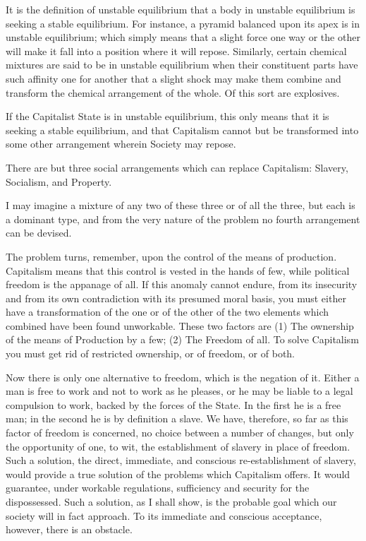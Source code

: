 \documentclass{book}
\begin{document}
It is the definition of unstable equilibrium that a body in unstable equilibrium is seeking a stable equilibrium. For instance, a pyramid balanced upon its apex is in unstable equilibrium; which simply means that a slight force one way or the other will make it fall into a position where it will repose. Similarly, certain chemical mixtures are said to be in unstable equilibrium when their constituent parts have such affinity one for another that a slight shock may make them combine and transform the chemical arrangement of the whole. Of this sort are explosives.

If the Capitalist State is in unstable equilibrium, this only means that it is seeking a stable equilibrium, and that Capitalism cannot but be transformed into some other arrangement wherein Society may repose.

There are but three social arrangements which can replace Capitalism: Slavery, Socialism, and Property.

I may imagine a mixture of any two of these three or of all the three, but each is a dominant type, and from the very nature of the problem no fourth arrangement can be devised.

The problem turns, remember, upon the control of the means of production. Capitalism means that this control is vested in the hands of few, while political freedom is the appanage of all. If this anomaly cannot endure, from its insecurity and from its own contradiction with its presumed moral basis, you must either have a transformation of the one or of the other of the two elements which combined have been found unworkable. These two factors are (1) The ownership of the means of Production by a few; (2) The Freedom of all. To solve Capitalism you must get rid of restricted ownership, or of freedom, or of both.

Now there is only one alternative to freedom, which is the negation of it. Either a man is free to work and not to work as he pleases, or he may be liable to a legal compulsion to work, backed by the forces of the State. In the first he is a free man; in the second he is by definition a slave. We have, therefore, so far as this factor of freedom is concerned, no choice between a number of changes, but only the opportunity of one, to wit, the establishment of slavery in place of freedom. Such a solution, the direct, immediate, and conscious re-establishment of slavery, would provide a true solution of the problems which Capitalism offers. It would guarantee, under workable regulations, sufficiency and security for the dispossessed. Such a solution, as I shall show, is the probable goal which our society will in fact approach. To its immediate and conscious acceptance, however, there is an obstacle.
\end{document}
